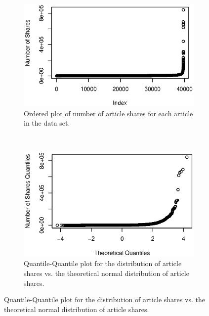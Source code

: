 \documentclass{article}
\begin{document}
\begin{figure}
    \center
    \begin{subfigure}[t]{0.45\textwidth}
        \includegraphics[width=\textwidth]{figs/zz-00-cumulative-plot-shares}
        \caption{Ordered plot of number of article shares for each article in the data set.}
    \end{subfigure}
    ~
    \begin{subfigure}[t]{0.45\textwidth}
        \includegraphics[width=\textwidth]{figs/zz-01-quantiles-number-of-shares}
        \caption{Quantile-Quantile plot for the distribution of article shares vs. the theoretical normal distribution of article shares.}
    \end{subfigure}
    

\end{figure}
\end{document}
